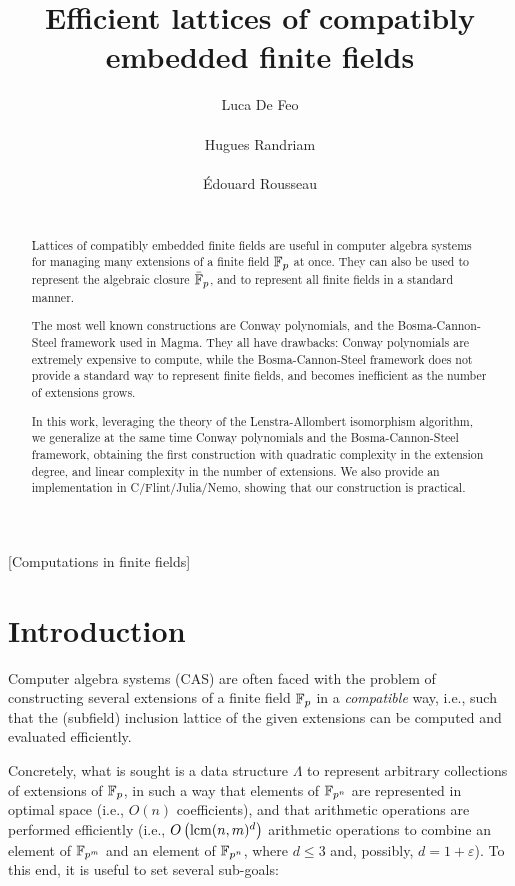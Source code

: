 \documentclass{sig-alternate}
\author{
  \alignauthor Luca De Feo\\
  \affaddr{Universit\'e Paris Saclay -- UVSQ, LMV}\\
  \email{luca.de-feo@uvsq.fr}
  \alignauthor Hugues Randriam\\
  \affaddr{LTCI, T\'el\'ecom ParisTech}\\
  \email{randriam@enst.fr}
  \alignauthor \'Edouard Rousseau\\
  \affaddr{LTCI, T\'el\'ecom ParisTech,\\
    Universit\'e Paris Saclay -- UVSQ, LMV}\\
  \email{erousseau@enst.fr}
}
\title{Efficient lattices of compatibly embedded finite fields}
\begin{document}
\maketitle

\begin{abstract}
  Lattices of compatibly embedded finite fields are useful in computer
  algebra systems for managing many extensions of a finite field
  $\mathbb{F}_p$ at once. %
  They can also be used to represent the algebraic closure $\bar{\mathbb{F}}_p$,
  and to represent all finite fields in a standard manner.

  The most well known constructions are Conway polynomials, and the
  Bosma-Cannon-Steel framework used in Magma. %
  They all have drawbacks: Conway polynomials are extremely expensive
  to compute, while the Bosma-Cannon-Steel framework does not provide
  a standard way to represent finite fields, and becomes inefficient
  as the number of extensions grows.

  In this work, leveraging the theory of the Lenstra-Allombert
  isomorphism algorithm, we generalize at the same time Conway
  polynomials and the Bosma-Cannon-Steel framework, obtaining the
  first construction with quadratic complexity in the extension
  degree, and linear complexity in the number of extensions. %
  We also provide an implementation in C/Flint/Julia/Nemo, showing
  that our construction is practical.
\end{abstract}

[Computations in finite fields]

\section{Introduction}
\label{sec:introduction}

Computer algebra systems (CAS) are often faced with the problem of
constructing several extensions of a finite field $\mathbb{F}_p$ in a
\emph{compatible} way, i.e., such that the (subfield) inclusion
lattice of the given extensions can be computed and evaluated
efficiently.

Concretely, what is sought is a data structure $\Lambda$ to represent
arbitrary collections of extensions of $\mathbb{F}_{p}$, in such a way that
elements of $\mathbb{F}_{p^n}$ are represented in optimal space (i.e., $O(n)$
coefficients), and that arithmetic operations are performed
efficiently (i.e., $O\left(\operatorname{lcm}(n,m)^d\right)$ arithmetic operations
to combine an element of $\mathbb{F}_{p^m}$ and an element of $\mathbb{F}_{p^n}$,
where $d\le 3$ and, possibly, $d=1+\varepsilon$). %
To this end, it is useful to set several sub-goals:
\end{document}
